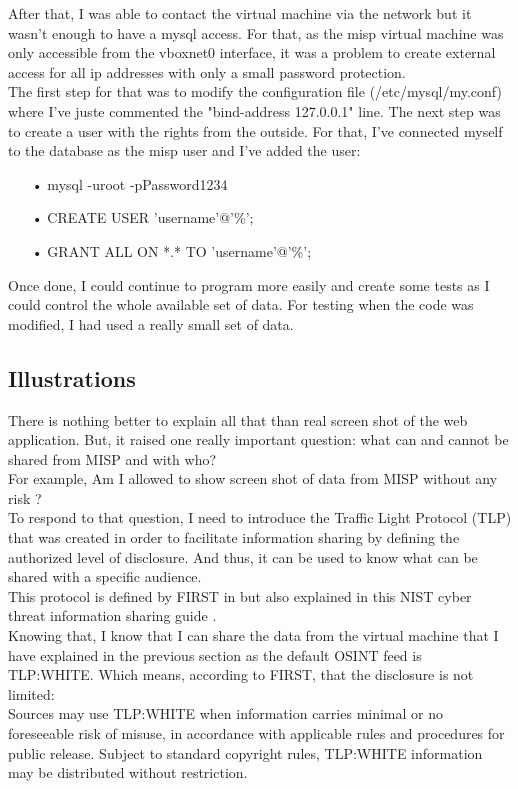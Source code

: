 \documentclass{eplmastersthesis}
\begin{document}
After that, I was able to contact the virtual machine via the network but it wasn't enough to have a mysql access. For that, as the misp virtual machine was only accessible from the vboxnet0 interface, it was a problem to create external access for all ip addresses with only a small password protection.\\
The first step for that was to modify the configuration file (/etc/mysql/my.conf) where I've juste commented the "bind-address 127.0.0.1" line.
The next step was to create a user with the rights from the outside. For that, I've connected myself to the database as the misp user and I've added the user:
\begin{itemize}
\item[•] mysql -uroot -pPassword1234 
\item[•] CREATE USER 'username'@'\%';
\item[•] GRANT ALL ON *.* TO 'username'@'\%';
\end{itemize}

Once done, I could continue to program more easily and create some tests as I could control the whole available set of data. For testing when the code was modified, I had used a really small set of data. \\

\subsection{Illustrations}
There is nothing better to explain all that than real screen shot of the web application. But, it raised one really important question: what can and cannot be shared from MISP and with who?\\
For example, Am I allowed to show screen shot of data from MISP without any risk ?\\
To respond to that question, I need to introduce the Traffic Light Protocol (TLP) that was created in order to facilitate information sharing by defining the authorized level of disclosure. And thus, it can be used to know what can be shared with a specific audience.\\
This protocol is defined by FIRST in \cite{FirstTLP} but also explained in this NIST cyber threat information sharing guide \cite{johnson2016guide}.\\

Knowing that, I know that I can share the data from the virtual machine that I have explained in the previous section as the default OSINT feed is TLP:WHITE. Which means, according to FIRST, that the disclosure is not limited: \\
Sources may use TLP:WHITE when information carries minimal or no foreseeable risk of misuse, in accordance with applicable rules and procedures for public release. Subject to standard copyright rules, TLP:WHITE information may be distributed without restriction.\\
\end{document}

